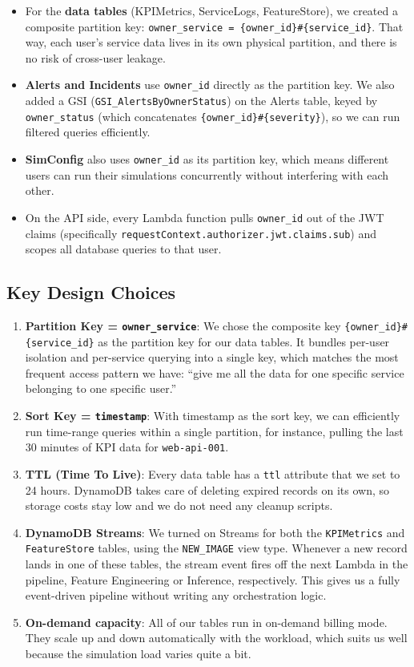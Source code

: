 \documentclass[11pt,a4paper]{article}
\begin{document}
\begin{itemize}[leftmargin=2em]
    \item For the \textbf{data tables} (KPIMetrics, ServiceLogs, FeatureStore), we created a composite partition key: \texttt{owner\_service = \{owner\_id\}\#\{service\_id\}}. That way, each user's service data lives in its own physical partition, and there is no risk of cross-user leakage.
    \item \textbf{Alerts and Incidents} use \texttt{owner\_id} directly as the partition key. We also added a GSI (\texttt{GSI\_AlertsByOwnerStatus}) on the Alerts table, keyed by \texttt{owner\_status} (which concatenates \texttt{\{owner\_id\}\#\{severity\}}), so we can run filtered queries efficiently.
    \item \textbf{SimConfig} also uses \texttt{owner\_id} as its partition key, which means different users can run their simulations concurrently without interfering with each other.
    \item On the API side, every Lambda function pulls \texttt{owner\_id} out of the JWT claims (specifically \texttt{requestContext.authorizer.jwt.claims.sub}) and scopes all database queries to that user.
\end{itemize}

\subsection{Key Design Choices}

\begin{enumerate}[leftmargin=2em]
    \item \textbf{Partition Key = \texttt{owner\_service}}: We chose the composite key \texttt{\{owner\_id\}\#\{service\_id\}} as the partition key for our data tables. It bundles per-user isolation and per-service querying into a single key, which matches the most frequent access pattern we have: ``give me all the data for one specific service belonging to one specific user.''
    \item \textbf{Sort Key = \texttt{timestamp}}: With timestamp as the sort key, we can efficiently run time-range queries within a single partition, for instance, pulling the last 30 minutes of KPI data for \texttt{web-api-001}.
    \item \textbf{TTL (Time To Live)}: Every data table has a \texttt{ttl} attribute that we set to 24 hours. DynamoDB takes care of deleting expired records on its own, so storage costs stay low and we do not need any cleanup scripts.
    \item \textbf{DynamoDB Streams}: We turned on Streams for both the \texttt{KPIMetrics} and \texttt{FeatureStore} tables, using the \texttt{NEW\_IMAGE} view type. Whenever a new record lands in one of these tables, the stream event fires off the next Lambda in the pipeline, Feature Engineering or Inference, respectively. This gives us a fully event-driven pipeline without writing any orchestration logic.
    \item \textbf{On-demand capacity}: All of our tables run in on-demand billing mode. They scale up and down automatically with the workload, which suits us well because the simulation load varies quite a bit.
\end{enumerate}
\end{document}
